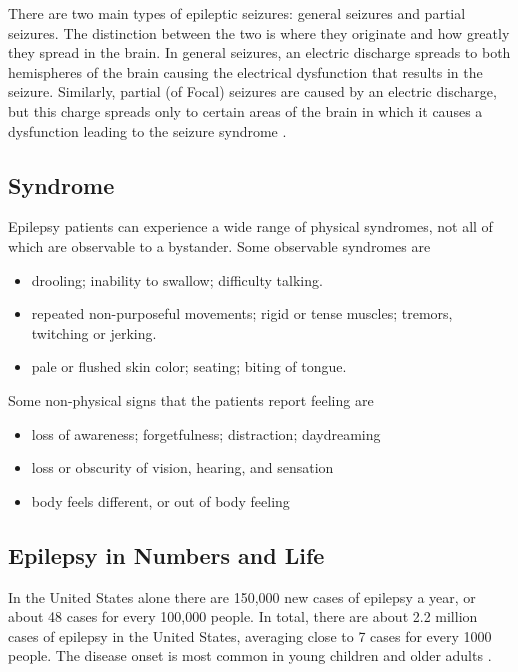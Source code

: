 There are two main types of epileptic seizures: general seizures and partial seizures. The distinction between the two is where they originate and how greatly they spread in the brain. In general seizures, an electric discharge spreads to both hemispheres of the brain causing the electrical dysfunction that results in the seizure. Similarly, partial (of Focal) seizures are caused by an electric discharge, but this charge spreads only to certain areas of the brain in which it causes a dysfunction leading to the seizure syndrome \cite{Epilepsy.com.NewTerms}. 

\subsection{Syndrome}
Epilepsy patients can experience a wide range of physical syndromes, not all of which are observable to a bystander. Some observable syndromes are 
\begin{itemize}
	\item drooling; inability to swallow; difficulty talking.
	\item repeated non-purposeful movements; rigid or tense muscles; tremors, twitching or jerking.
	\item pale or flushed skin color; seating; biting of tongue.
\end{itemize}

Some non-physical signs that the patients report feeling are
\begin{itemize}
	\item loss of awareness; forgetfulness; distraction; daydreaming
	\item loss or obscurity of vision, hearing, and sensation
	\item body feels different, or out of body feeling
\end{itemize}

\subsection{Epilepsy in Numbers and Life}
In the United States alone there are 150,000 new cases of epilepsy a year, or about 48 cases for every 100,000 people. In total, there are about 2.2 million cases of epilepsy in the United States, averaging close to 7 cases for every 1000 people. The disease onset is most common in young children and older adults \cite{Epilepsy.com.stats}. 

